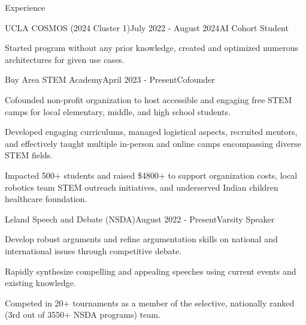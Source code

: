 \documentclass[
  11pt, %
]{public/resume/resume} %
\begin{document}
\begin{rSection}{Experience}
\begin{rSubsection}{UCLA COSMOS (2024 Cluster 1)}{July 2022 - August 2024}{AI Cohort Student}{}
    \item Started program without any prior knowledge, created and optimized numerous architectures for given use cases.
    
  \end{rSubsection}
        
  \begin{rSubsection}{Bay Area STEM Academy}{April 2023 - Present}{Cofounder}{}
    
    \item Cofounded non-profit organization to host accessible and engaging free STEM camps for local elementary, middle, and high school students.
    
    \item Developed engaging curriculums, managed logistical aspects, recruited mentors, and effectively taught multiple in-person and online camps encompassing diverse STEM fields.
    
    \item Impacted 500+ students and raised \$4800+ to support organization costs, local robotics team STEM outreach initiatives, and underserved Indian children healthcare foundation.
    
  \end{rSubsection}
        
  \begin{rSubsection}{Leland Speech and Debate (NSDA)}{August 2022 - Present}{Varsity Speaker}{}
    
    \item Develop robust arguments and refine argumentation skills on national and international issues through competitive debate.
    
    \item Rapidly synthesize compelling and appealing speeches using current events and existing knowledge.
    
    \item Competed in 20+ tournaments as a member of the selective, nationally ranked (3rd out of 3550+ NSDA programs) team.
    
  \end{rSubsection}
        
	
\end{rSection}

\end{document}

